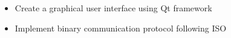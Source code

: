 \documentclass[10pt,a4paper,ragged2e,withhyper]{altacv}
\begin{document}
\begin{paracol}{2}
    



    



\begin{itemize}
\item Create a graphical user interface using Qt framework
\item Implement binary communication protocol following ISO
\end{itemize}
 \\


\end{paracol}
\end{document}
